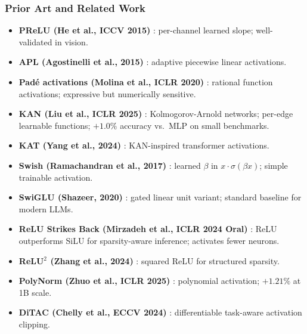 \documentclass[11pt]{article}
\begin{document}
\subsubsection*{Prior Art and Related Work}
\begin{itemize}
  \item \textbf{PReLU (He et al., ICCV 2015)} \cite{HeEtAl2015PReLU}: per-channel learned slope; well-validated in vision.

  \item \textbf{APL (Agostinelli et al., 2015)} \cite{AgostinelliEtAl2015}: adaptive piecewise linear activations.

  \item \textbf{Pad\'{e} activations (Molina et al., ICLR 2020)} \cite{MolinaEtAl2020}: rational function activations; expressive but numerically sensitive.

  \item \textbf{KAN (Liu et al., ICLR 2025)} \cite{LiuEtAl2025KAN}: Kolmogorov-Arnold networks; per-edge learnable functions; $+1.0\%$ accuracy vs.\ MLP on small benchmarks.

  \item \textbf{KAT (Yang et al., 2024)} \cite{YangEtAl2024KAT}: KAN-inspired transformer activations.

  \item \textbf{Swish (Ramachandran et al., 2017)} \cite{RamachandranEtAl2017}: learned $\beta$ in $x \cdot \sigma(\beta x)$; simple trainable activation.

  \item \textbf{SwiGLU (Shazeer, 2020)} \cite{Shazeer2020SwiGLU}: gated linear unit variant; standard baseline for modern LLMs.

  \item \textbf{ReLU Strikes Back (Mirzadeh et al., ICLR 2024 Oral)} \cite{MirzadehEtAl2024}: ReLU outperforms SiLU for sparsity-aware inference; activates fewer neurons.

  \item \textbf{ReLU$^2$ (Zhang et al., 2024)} \cite{ZhangEtAl2024ReLU2}: squared ReLU for structured sparsity.

  \item \textbf{PolyNorm (Zhuo et al., ICLR 2025)} \cite{ZhuoEtAl2025}: polynomial activation; $+1.21\%$ at 1B scale.

  \item \textbf{DiTAC (Chelly et al., ECCV 2024)} \cite{ChellyEtAl2024}: differentiable task-aware activation clipping.


\end{itemize}
\end{document}
